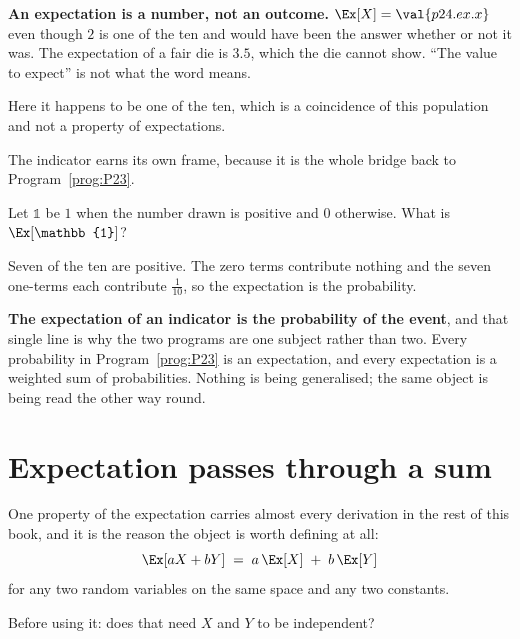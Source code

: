 \begin{fr}

\begin{notationbox}
\textbf{An expectation is a number, not an outcome.} $\Ex[X] = \val{p24.ex.x}$
even though $2$ is one of the ten and would have been the answer whether or
not it was. The expectation of a fair die is $\num{3.5}$, which the die cannot
show. \enquote{The value to expect} is not what the word means.
\end{notationbox}

Here it happens to be one of the ten, which is a coincidence of this
population and not a property of expectations.
\end{fr}

\begin{fr}
The indicator earns its own frame, because it is the whole bridge back to
Program~\ref{prog:P23}.

Let $\mathbb{1}$ be $1$ when the number drawn is positive and $0$ otherwise.
What is $\Ex[\mathbb{1}]$?
\dotline
\nextframe
\end{fr}

\begin{fr}

Seven of the ten are positive. The zero terms contribute nothing and the seven
one-terms each contribute $\frac{1}{10}$, so the expectation is the
probability.

\textbf{The expectation of an indicator is the probability of the event}, and
that single line is why the two programs are one subject rather than two.
Every probability in Program~\ref{prog:P23} is an expectation, and every
expectation is a weighted sum of probabilities. Nothing is being generalised;
the same object is being read the other way round.

\end{fr}

\section{Expectation passes through a sum}
\label{sec:P24-linearity}

\begin{fr}
One property of the expectation carries almost every derivation in the rest of
this book, and it is the reason the object is worth defining at all:
\[ \Ex[aX + bY] \;=\; a\,\Ex[X] \;+\; b\,\Ex[Y] \]
for any two random variables on the same space and any two constants.

Before using it: does that need $X$ and $Y$ to be independent?
\dotline
\nextframe
\end{fr}

